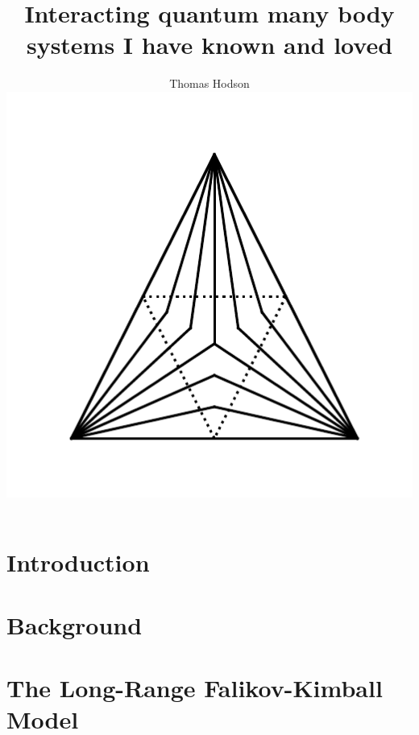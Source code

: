 \documentclass[a4paper,12pt]{report}
\begin{document}
\title{\LARGE {\bf Interacting quantum many body systems I have known and loved}\\
 \vspace*{6mm}
}

\author{Thomas Hodson\\\vspace{10mm}
\includegraphics[width=.4\textwidth,height=.4\textheight]{figure_code/logo/logo}
\vspace{-0.4\textheight}
\vspace{10mm}
}


\maketitle

\preface



% 
% 

\body
\chapter{Introduction}


\chapter{Background}




\chapter{The Long-Range Falikov-Kimball Model}



\end{document}
